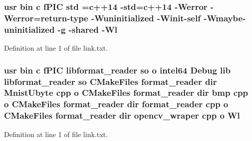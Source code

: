 \subsubsection[{\texorpdfstring{std}{std}}]{\setlength{\rightskip}{0pt plus 5cm}usr bin {\bf c} f\+P\+IC std ={\bf c}++14 -\/std={\bf c}++14 -\/Werror -\/Werror=return-\/type -\/Wuninitialized -\/Winit-\/self -\/Wmaybe-\/uninitialized -\/g -\/shared -\/{\bf Wl}}\hypertarget{common_2format__reader_2CMakeFiles_2format__reader_8dir_2link_8txt_a5f87c8f8e33670f7c8c5221b6be1bcc4}{}\label{common_2format__reader_2CMakeFiles_2format__reader_8dir_2link_8txt_a5f87c8f8e33670f7c8c5221b6be1bcc4}


Definition at line 1 of file link.\+txt.

\subsubsection[{\texorpdfstring{Wl}{Wl}}]{\setlength{\rightskip}{0pt plus 5cm}usr bin {\bf c} f\+P\+IC libformat\+\_\+reader {\bf so} o intel64 Debug lib libformat\+\_\+reader {\bf so} C\+Make\+Files format\+\_\+reader dir Mnist\+Ubyte cpp o C\+Make\+Files format\+\_\+reader dir bmp cpp o C\+Make\+Files format\+\_\+reader dir format\+\_\+reader cpp o C\+Make\+Files format\+\_\+reader dir opencv\+\_\+wraper cpp o Wl}\hypertarget{common_2format__reader_2CMakeFiles_2format__reader_8dir_2link_8txt_a9ad53fca0052428aab5ca4eb56074e08}{}\label{common_2format__reader_2CMakeFiles_2format__reader_8dir_2link_8txt_a9ad53fca0052428aab5ca4eb56074e08}


Definition at line 1 of file link.\+txt.

